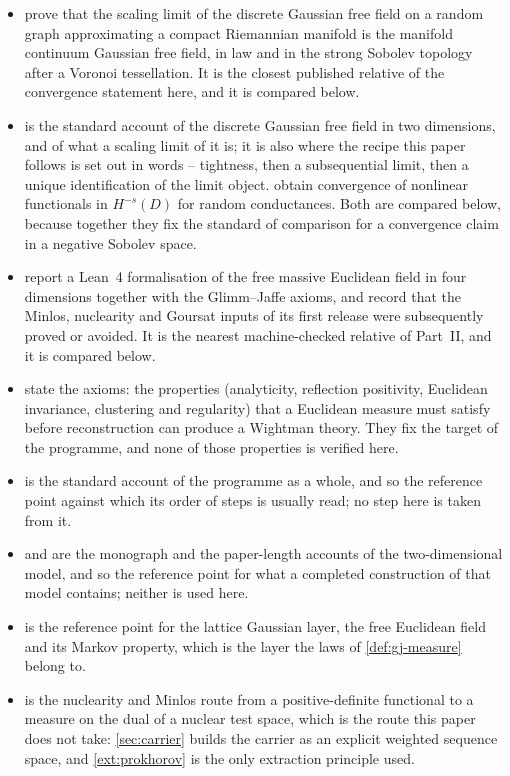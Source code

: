 \begin{itemize}
\item \cite{cipriani2020} prove that the scaling limit of the discrete Gaussian
  free field on a random graph approximating a compact Riemannian manifold is
  the manifold continuum Gaussian free field, in law and in the strong Sobolev
  topology after a Voronoi tessellation.  It is the closest published relative
  of the convergence statement here, and it is compared below.
\item \cite{biskup2020} is the standard account of the discrete Gaussian free
  field in two dimensions, and of what a scaling limit of it is; it is also where
  the recipe this paper follows is set out in words -- tightness, then a
  subsequential limit, then a unique identification of the limit object.
  \cite{peter2026} obtain convergence of nonlinear functionals in $H^{-s}(D)$ for
  random conductances.  Both are compared below, because together they fix the
  standard of comparison for a convergence claim in a negative Sobolev space.
\item \cite{douglas2026} report a Lean~4 formalisation of the free massive
  Euclidean field in four dimensions together with the Glimm--Jaffe axioms, and
  record that the Minlos, nuclearity and Goursat inputs of its first release were
  subsequently proved or avoided.  It is the nearest machine-checked relative of
  Part~II, and it is compared below.
\item \cite{ossier1973,ossier1975} state the axioms: the properties
  (analyticity, reflection positivity, Euclidean invariance, clustering and
  regularity) that a Euclidean measure must satisfy before reconstruction can
  produce a Wightman theory.  They fix the target of the programme, and none of
  those properties is verified here.
\item \cite{gj1987} is the standard account of the programme as a whole, and so
  the reference point against which its order of steps is usually read; no step
  here is taken from it.
\item \cite{simon1974} and \cite{grs1975} are the monograph and the paper-length
  accounts of the two-dimensional model, and so the reference point for what a
  completed construction of that model contains; neither is used here.
\item \cite{nelson1973} is the reference point for the lattice Gaussian layer,
  the free Euclidean field and its Markov property, which is the layer the laws
  of \cref{def:gj-measure} belong to.
\item \cite{minlos1959} is the nuclearity and Minlos route from a
  positive-definite functional to a measure on the dual of a nuclear test space,
  which is the route this paper does not take: \cref{sec:carrier} builds the
  carrier as an explicit weighted sequence space, and \cref{ext:prokhorov} is
  the only extraction principle used.
\end{itemize}

